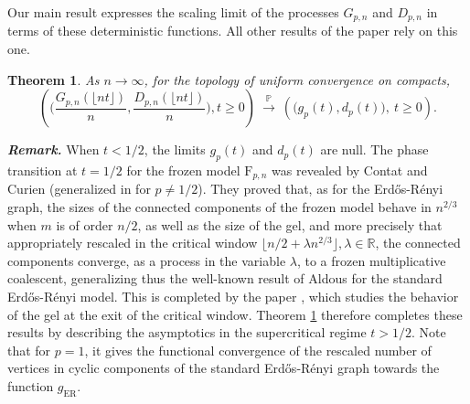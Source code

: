 \documentclass[a4, 11pt]{article}
\numberwithin{equation}{section}
\theoremstyle{plain}
\newtheorem{theorem}{Theorem}[section]
\theoremstyle{definition}
\theoremstyle{remark}
\begin{document}
Our main result expresses the scaling limit of the processes $G_{p,n}$ and $D_{p,n}$ in terms of these deterministic functions. All other results of the paper rely on this one.

\begin{theorem}
\label{thm:fluid limit}
As $n \rightarrow \infty$, for the topology of uniform convergence on compacts,
$$\left(\bigg(\frac{G_{p,n}(\lfloor nt\rfloor)}{n}, \frac{D_{p,n}(\lfloor nt\rfloor)}{n} \bigg), t \geq 0 \right) ~\overset{\mathbb P}\longrightarrow~\left(\big(g_p(t),d_p(t)\big), ~t\geq 0 \right).$$
\end{theorem}

\vspace{-0.2cm}

\begin{figure}[!h]
	\centering
	\qquad {}	
	\label{fig:f_p_d_p}
\end{figure}

\bigskip

\emph{\textbf{Remark.}} When $t<1/2$, the limits $g_p(t)$ and $d_p(t)$ are null.  The phase transition at $t=1/2$ for the frozen model $\mathrm F_{p,n}$ was revealed by Contat and Curien \cite{ContatCurien23} (generalized in \cite{viau25} for $p\neq 1/2$). They proved that, as for the Erd\H{o}s-R\'enyi graph, the sizes of the connected components of the frozen model behave in $n^{2/3}$ when $m$ is of order $n/2$, as well as the size of the gel, and more precisely that appropriately rescaled in the critical window $ \lfloor n/2  + \lambda n^{2/3}\rfloor, \lambda \in \mathbb R$, the connected components converge, as a process in the variable $\lambda$, to a frozen multiplicative coalescent, generalizing thus the well-known result of Aldous \cite{aldous97} for the standard Erd\H{o}s-R\'enyi model. 
This is completed by the paper \cite{viau24}, which studies the behavior of the gel at the exit of the critical window. Theorem \ref{thm:fluid limit} therefore completes these results by describing the asymptotics in the supercritical regime $t>1/2$. Note that for $p=1$, it gives the functional convergence of the rescaled number of vertices in cyclic components of the standard Erd\H{o}s-R\'enyi graph towards the function $g_{\mathrm{ER}}$. 

\bigskip
\end{document}
